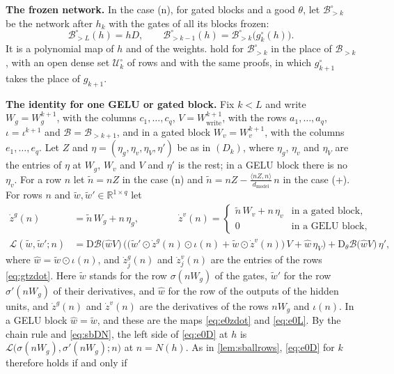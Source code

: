 \documentclass[10pt]{article}
\theoremstyle{definition}
\theoremstyle{remark}
\newcommand{\R}{\mathbb{R}}
\newcommand{\Wwrite}{W_{\mathrm{write}}}
\newcommand{\dm}{d_{\mathrm{model}}}
\newcommand{\Der}{\mathrm{D}}
\newcommand{\para}[1]{\smallskip\noindent\textbf{#1}\hspace{0.5em}}
\begin{document}
\para{The frozen network.} In the case (n), for gated blocks and a good $\theta$, let $\mathcal B^\circ_{>k}$ be the network after $h_k$ with the gates of all its blocks frozen:
\[
\mathcal B^\circ_{>L}(h) = hD, \qquad \mathcal B^\circ_{>k-1}(h) = \mathcal B^\circ_{>k}\big(g^\circ_k(h)\big).
\]
It is a polynomial map of $h$ and of the weights.  hold for $\mathcal B^\circ_{>k}$ in the place of $\mathcal B_{>k}$, with an open dense set $\mathcal U^\circ_k$ of rows and with the same proofs, in which $g^\circ_{k+1}$ takes the place of $g_{k+1}$.

\para{The identity for one GELU or gated block.} Fix $k < L$ and write $W_g = W_g^{k+1}$, with the columns $c_1, \dots, c_q$, $V = \Wwrite^{k+1}$, with the rows $a_1, \dots, a_q$, $\iota = \iota^{k+1}$ and $\mathcal B = \mathcal B_{>k+1}$, and in a gated block $W_v = W_v^{k+1}$, with the columns $e_1, \dots, e_q$. Let $Z$ and $\eta = (\eta_g, \eta_v, \eta_V, \eta')$ be as in $(D_k)$, where $\eta_g$, $\eta_v$ and $\eta_V$ are the entries of $\eta$ at $W_g$, $W_v$ and $V$ and $\eta'$ is the rest; in a GELU block there is no $\eta_v$. For a row $n$ let $\tilde n = nZ$ in the case (n) and $\tilde n = nZ - \frac{\langle nZ, n\rangle}{\dm}\,n$ in the case (+). For rows $n$ and $\tilde w, \tilde w' \in \R^{1\times q}$ let
\begin{align}
\dot z^g(n) &= \tilde n\,W_g + n\,\eta_g, \qquad\qquad \dot z^v(n) = \begin{cases} \tilde n\,W_v + n\,\eta_v & \text{in a gated block,}\\ 0 & \text{in a GELU block,}\end{cases} \label{eq:gtzdot}\\[3pt]
\mathcal L(\tilde w, \tilde w'; n) &= \Der\mathcal B\big(\hat wV\big)\,\Big(\big(\tilde w'\odot\dot z^g(n)\odot\iota(n) + \tilde w\odot\dot z^v(n)\big)\,V + \hat w\,\eta_V\Big) + \Der_\theta\mathcal B\big(\hat wV\big)\,\eta' , \label{eq:gtL}
\end{align}
where $\hat w = \tilde w\odot\iota(n)$, and $\dot z^g_j(n)$ and $\dot z^v_j(n)$ are the entries of the rows \eqref{eq:gtzdot}. Here $\tilde w$ stands for the row $\sigma(nW_g)$ of the gates, $\tilde w'$ for the row $\sigma'(nW_g)$ of their derivatives, and $\hat w$ for the row of the outputs of the hidden units, and $\dot z^g(n)$ and $\dot z^v(n)$ are the derivatives of the rows $nW_g$ and $\iota(n)$. In a GELU block $\hat w = \tilde w$, and these are the maps \eqref{eq:e0zdot} and \eqref{eq:e0L}. By the chain rule and \eqref{eq:sbDN}, the left side of \eqref{eq:e0D} at $h$ is $\mathcal L\big(\sigma(nW_g), \sigma'(nW_g); n\big)$ at $n = N(h)$. As in \cref{lem:sballrows}, \eqref{eq:e0D} for $k$ therefore holds if and only if
\end{document}
